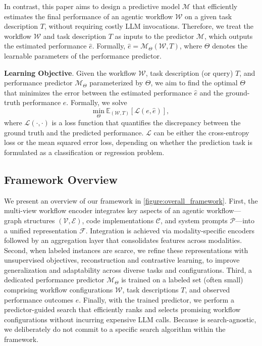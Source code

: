 In contrast, this paper aims to design a predictive model $\mathcal{M}$ that efficiently estimates the final performance of an agentic workflow $\mathcal{W}$ on a given task description $T$, without requiring costly LLM invocations. Therefore, we treat the workflow $\mathcal{W}$ and task description $T$ as inputs to the predictor $\mathcal{M}$, which outputs the estimated performance $\hat{e}$. Formally, $\hat{e} = \mathcal{M}_{\Theta}(\mathcal{W}, T)$, where $\Theta$ denotes the learnable parameters of the performance predictor.

\textbf{Learning Objective}. Given the workflow $\mathcal{W}$, task description (or query) $T$, and performance predictor $\mathcal{M}_{\Theta}$ parameterized by $\Theta$, we aim to find the optimal $\Theta$ that minimizes the error between the estimated performance $\hat{e}$ and the ground-truth performance $e$. Formally, we solve
\begin{equation} \label{eq:learning_objective}
    \underset{\Theta}{\mathrm{min}}~\mathbb{E}_{(\mathcal{W}, T)} [\mathcal{L}(e, \hat{e})],
\end{equation}
where $\mathcal{L}(\cdot,\cdot)$ is a loss function that quantifies the discrepancy between the ground truth and the predicted performance. $\mathcal{L}$ can be either the cross-entropy loss or the mean squared error loss, depending on whether the prediction task is formulated as a classification or regression problem.


\subsection{Framework Overview}
We present an overview of our \ours{} framework in \autoref{figure:overall_framework}. First, the multi-view workflow encoder integrates key aspects of an agentic workflow---graph structures $(\mathcal{V}, \mathcal{E})$, code implementations $\mathcal{C}$, and system prompts $\mathcal{P}$---into a unified representation $\mathcal{F}$. Integration is achieved via modality-specific encoders followed by an aggregation layer that consolidates features across modalities. Second, when labeled instances are scarce, we refine these representations with unsupervised objectives, reconstruction and contrastive learning, to improve generalization and adaptability across diverse tasks and configurations. Third, a dedicated performance predictor $\mathcal{M}_{\Theta}$ is trained on a labeled set (often small) comprising workflow configurations $\mathcal{W}$, task descriptions $T$, and observed performance outcomes $e$. Finally, with the trained predictor, we perform a predictor-guided search that efficiently ranks and selects promising workflow configurations without incurring expensive LLM calls. Because \ours{} is search-agnostic, we deliberately do not commit to a specific search algorithm within the framework.


